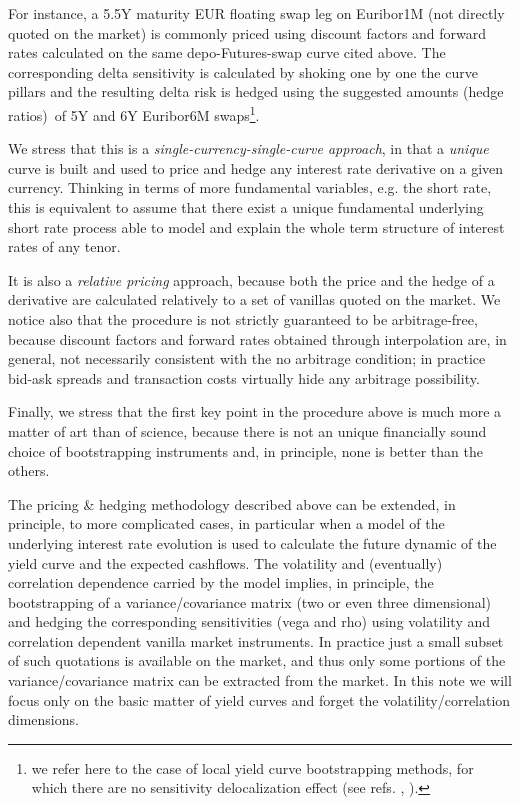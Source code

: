 \documentclass[11pt,reqno]{amsart}
\begin{document}
For instance, a 5.5Y maturity EUR floating swap leg on Euribor1M (not directly quoted on the market) is commonly priced using discount factors and forward rates calculated on the same depo-Futures-swap curve cited above. The corresponding delta sensitivity is calculated by shoking one by one the curve pillars and the resulting delta risk is hedged using the suggested amounts (hedge ratios)\ of 5Y and 6Y Euribor6M swaps\footnote{we refer here to the case of local yield curve bootstrapping methods, for which there are no sensitivity delocalization effect (see refs. \cite{HaganWest2008}, \cite{HaganWest2006}).}.

We stress that this is a \textit{single-currency-single-curve approach}, in that a \textit{unique} curve is built and used to price and hedge any interest rate derivative on a given currency. Thinking in terms of more fundamental variables, e.g. the short rate, this is equivalent to assume that there exist a unique fundamental underlying short rate process able to model and explain the whole term structure of interest rates of any tenor.

It is also a \textit{relative pricing} approach, because both the price and the hedge of a derivative are calculated relatively to a set of vanillas quoted on the market. We notice also that the procedure is not strictly guaranteed to be arbitrage-free, because discount factors and forward rates obtained through interpolation are, in general, not necessarily consistent with the no arbitrage condition; in practice bid-ask spreads and transaction costs virtually hide any arbitrage possibility.

Finally, we stress that the first key point in the procedure above is much more a matter of art than of science, because there is not an unique financially sound choice of bootstrapping instruments and, in principle, none is better than the others.

The pricing \& hedging methodology described above can be extended, in principle, to more complicated cases, in particular when a model of the underlying interest rate evolution is used to calculate the future dynamic of the yield curve and the expected cashflows. The volatility and (eventually) correlation dependence carried by the model implies, in principle, the bootstrapping of a variance/covariance matrix (two or even three dimensional) and hedging the corresponding sensitivities (vega and rho) using volatility and correlation dependent vanilla market instruments. In practice just a small subset of such quotations is available on the market, and thus only some portions of the variance/covariance matrix can be extracted from the market. In this note we will focus only on the basic matter of yield curves and forget the volatility/correlation dimensions.
\end{document}
